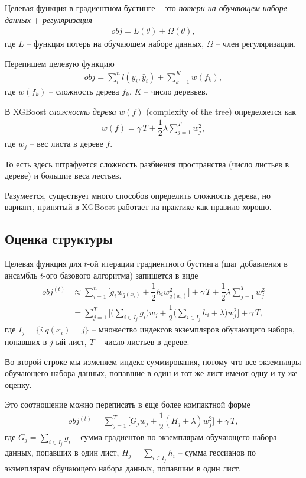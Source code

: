\documentclass[%
	11pt,
	a4paper,
	utf8,
		]{article}
\begin{document}
Целевая функция в градиентном бустинге -- это \emph{потери на обучающем наборе данных} + \emph{регуляризация}
\begin{align*}
	obj  = L(\theta) + \Omega (\theta),
\end{align*}
где $ L $ -- функция потерь на обучающем наборе данных, $ \Omega $ -- член регуляризации.

Перепишем целевую функцию
\begin{align*}
	obj = \sum_i^n l(y_i, \hat{y}_i) +\sum_{k=1}^K w(f_k),
\end{align*}
где $ w(f_k) $ -- сложность дерева $ f_k $, $ K $ -- число деревьев.

В XGBoost \emph{сложность дерева} $ w(f) $ (complexity of the tree) определяется как
\begin{align*}
	w(f) = \gamma \, T + \dfrac{1}{2} \lambda \sum_{j=1}^{T} w_j^2,
\end{align*}
где $ w_j $ -- вес листа в дереве $ f $.

То есть здесь штрафуется сложность разбиения пространства (число листьев в дереве) и большие веса лестьев.

Разумеется, существует много способов определить сложность дерева, но вариант, принятый в XGBoost работает на практике как правило хорошо.

\subsection{Оценка структуры}

Целевая функция для $ t $-ой итерации градиентного бустинга (шаг добавления в ансамбль $ t $-ого базового алгоритма) запишется в виде
\begin{align*}
	obj^{(t)} &\approx \sum_{i=1}^n \Big[ g_i w_{ q(x_i) } + \dfrac{1}{2}h_i w_{ q(x_i) }^2 \Big] + \gamma \, T + \dfrac{1}{2} \lambda \sum_{j=1}^T w_j^2 \\
	 &= \sum_{j=1}^T \Big[ \Big( \sum_{ i \in I_j } g_i \Big) w_j + \dfrac{1}{2} \Big( \sum_{i \in I_j} h_i +\lambda \Big) w_j^2 \Big] + \gamma \, T,
\end{align*}
где $ I_j = \{ i | q(x_i) = j \} $ -- множество индексов экземпляров обучающего набора, попавших в $ j $-ый лист, $ T $ -- число листьев в дереве.

Во второй строке мы изменяем индекс суммирования, потому что все экземпляры обучающего набора данных, попавшие в один и тот же лист имеют одну и ту же оценку.

Это соотношение можно переписать в еще более компактной форме
\begin{align*}
	obj^{(t)} = \sum_{j=1}^T \Big[ G_j w_j + \dfrac{1}{2} (H_j + \lambda)w_j^2 \Big] + \gamma \, T,
\end{align*}
где $ G_j = \sum_{i \in I_j} g_i $ -- сумма градиентов по экземплярам обучающего набора данных, попавших в один лист, $ H_j = \sum_{ i \in I_j } h_i $ -- сумма гессианов по экзмеплярам обучающего набора данных, попавшим в один лист.
\end{document}
